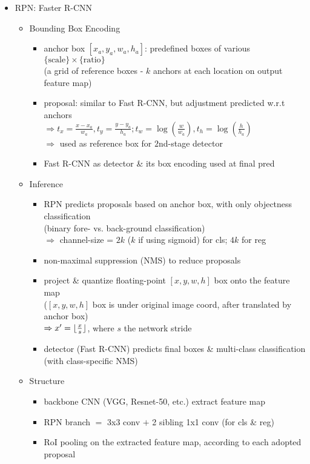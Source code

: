 \begin{itemize}
\item RPN: Faster R-CNN
	\begin{itemize}
	\item Bounding Box Encoding
		\begin{itemize}
		\item anchor box $[x_a, y_a, w_a, h_a]$: predefined boxes of various $\{\text{scale}\}\times\{\text{ratio}\}$ \\
		(a grid of reference boxes - $k$ anchors at each location on output feature map)
		\item proposal: similar to Fast R-CNN, but adjustment predicted w.r.t anchors \\
		$\Rightarrow t_x = \frac {x-x_a} {w_a}, t_y = \frac{y-y_a}{h_a}; t_w = \log(\frac{w} {w_a}), t_h = \log(\frac{h}{h_a})$ \\
		$\Rightarrow$ used as reference box for $2$nd-stage detector
		\item Fast R-CNN as detector \& its box encoding used at final pred
		\end{itemize}
	\item Inference
		\begin{itemize}
		\item RPN predicts proposals based on anchor box, with only objectness classification \\
		(binary fore- vs. back-ground classification) \\
		$\Rightarrow$ channel-size = $2k$ ($k$ if using sigmoid) for cls; $4k$ for reg
		\item non-maximal suppression (NMS) to reduce proposals
		\item project \& quantize floating-point $[x,y,w,h]$ box onto the feature map \\
		($[x,y,w,h]$ box is under original image coord, after translated by anchor box) \\
		$\Rightarrow x'=\lfloor\frac{x}{s}\rfloor$, where $s$ the network stride
		\item detector (Fast R-CNN) predicts final boxes \& multi-class classification \\ 
		(with class-specific NMS)
		\end{itemize}
	\item Structure
		\begin{itemize}
		\item backbone CNN (VGG, Resnet-50, etc.) extract feature map
		\item RPN branch $=$ 3x3 conv $+$ 2 sibling 1x1 conv (for cls \& reg)
		\item RoI pooling on the extracted feature map, according to each adopted proposal

\end{itemize}
\end{itemize}
\end{itemize}
